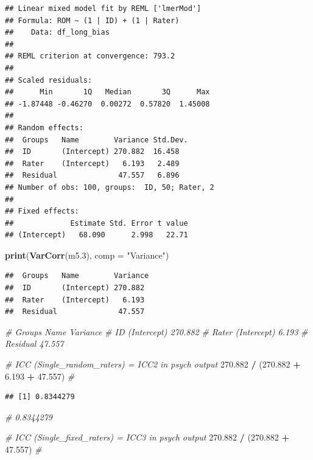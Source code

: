\documentclass[
]{article}
\newenvironment{Shaded}{\begin{snugshade}}{\end{snugshade}}
\newcommand{\AttributeTok}[1]{\textcolor[rgb]{0.13,0.29,0.53}{#1}}
\newcommand{\CommentTok}[1]{\textcolor[rgb]{0.56,0.35,0.01}{\textit{#1}}}
\newcommand{\FloatTok}[1]{\textcolor[rgb]{0.00,0.00,0.81}{#1}}
\newcommand{\FunctionTok}[1]{\textcolor[rgb]{0.13,0.29,0.53}{\textbf{#1}}}
\newcommand{\NormalTok}[1]{#1}
\newcommand{\SpecialCharTok}[1]{\textcolor[rgb]{0.81,0.36,0.00}{\textbf{#1}}}
\newcommand{\StringTok}[1]{\textcolor[rgb]{0.31,0.60,0.02}{#1}}
\begin{document}
\begin{verbatim}
## Linear mixed model fit by REML ['lmerMod']
## Formula: ROM ~ (1 | ID) + (1 | Rater)
##    Data: df_long_bias
## 
## REML criterion at convergence: 793.2
## 
## Scaled residuals: 
##      Min       1Q   Median       3Q      Max 
## -1.87448 -0.46270  0.00272  0.57820  1.45008 
## 
## Random effects:
##  Groups   Name        Variance Std.Dev.
##  ID       (Intercept) 270.882  16.458  
##  Rater    (Intercept)   6.193   2.489  
##  Residual              47.557   6.896  
## Number of obs: 100, groups:  ID, 50; Rater, 2
## 
## Fixed effects:
##             Estimate Std. Error t value
## (Intercept)   68.090      2.998   22.71
\end{verbatim}

\begin{Shaded}
\begin{Highlighting}[]
\FunctionTok{print}\NormalTok{(}\FunctionTok{VarCorr}\NormalTok{(m5}\FloatTok{.3}\NormalTok{), }\AttributeTok{comp =} \StringTok{"Variance"}\NormalTok{)}
\end{Highlighting}
\end{Shaded}

\begin{verbatim}
##  Groups   Name        Variance
##  ID       (Intercept) 270.882 
##  Rater    (Intercept)   6.193 
##  Residual              47.557
\end{verbatim}

\begin{Shaded}
\begin{Highlighting}[]
\CommentTok{\# Groups   Name        Variance}
\CommentTok{\# ID       (Intercept) 270.882 }
\CommentTok{\# Rater    (Intercept)   6.193 }
\CommentTok{\# Residual              47.557 }


\CommentTok{\# ICC (Single\_random\_raters) = ICC2 in psych output}
\FloatTok{270.882} \SpecialCharTok{/}\NormalTok{ (}\FloatTok{270.882} \SpecialCharTok{+} \FloatTok{6.193} \SpecialCharTok{+} \FloatTok{47.557}\NormalTok{) }\CommentTok{\# }
\end{Highlighting}
\end{Shaded}

\begin{verbatim}
## [1] 0.8344279
\end{verbatim}

\begin{Shaded}
\begin{Highlighting}[]
\CommentTok{\# 0.8344279}

\CommentTok{\# ICC (Single\_fixed\_raters) = ICC3 in psych output}
\FloatTok{270.882} \SpecialCharTok{/}\NormalTok{ (}\FloatTok{270.882} \SpecialCharTok{+} \FloatTok{47.557}\NormalTok{) }\CommentTok{\#}
\end{Highlighting}
\end{Shaded}
\end{document}
